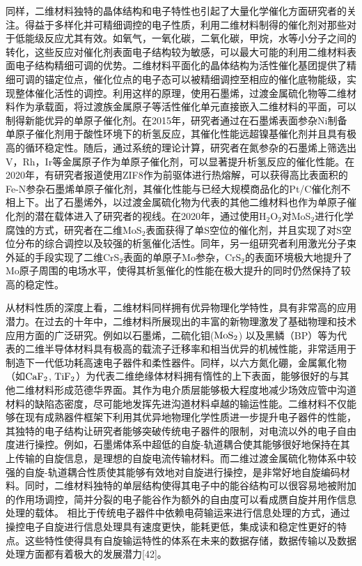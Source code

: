 同样，二维材料独特的晶体结构和电子特性也引起了大量化学催化方面研究者的关注。得益于多样化并可精细调控的电子性质，利用二维材料制得的催化剂对那些对于低能级反应尤其有效。如氧气，一氧化碳，二氧化碳，甲烷，水等小分子之间的转化，这些反应对催化剂表面电子结构较为敏感，可以最大可能的利用二维材料表面电子结构精细可调的优势。二维材料平面化的晶体结构为活性催化基团提供了精细可调的锚定位点，催化位点的电子态可以被精细调控至相应的催化底物能级，实现整体催化活性的调控。利用这样的原理，使用石墨烯，过渡金属硫化物等二维材料作为承载面，将过渡族金属原子等活性催化单元直接嵌入二维材料的平面，可以制得新能优异的单原子催化剂。在2015年，研究者通过在石墨烯表面参杂Ni制备单原子催化剂用于酸性环境下的析氢反应，其催化性能远超镍基催化剂并且具有极高的循环稳定性。随后，通过系统的理论计算，研究者在氮参杂的石墨烯上筛选出V，Rh，Ir等金属原子作为单原子催化剂，可以显著提升析氢反应的催化性能。在2020年，有研究者报道使用ZIF8作为前驱体进行热熔解，可以获得高比表面积的Fe-N参杂石墨烯单原子催化剂，其催化性能与已经大规模商品化的Pt/C催化剂不相上下。出了石墨烯外，以过渡金属硫化物为代表的其他二维材料也作为单原子催化剂的潜在载体进入了研究者的视线。在2020年，通过使用H$_2$O$_2$对MoS$_2$进行化学腐蚀的方式，研究者在二维MoS$_2$表面获得了单S空位的催化剂，并且实现了对S空位分布的综合调控以及较强的析氢催化活性。同年，另一组研究者利用激光分子束外延的手段实现了二维CrS$_2$表面的单原子Mo参杂，CrS$_2$的表面环境极大地提升了Mo原子周围的电场水平，使得其析氢催化的性能在极大提升的同时仍然保持了较高的稳定性。

从材料性质的深度上看，二维材料同样拥有优异物理化学特性，具有非常高的应用潜力。在过去的十年中，二维材料所展现出的丰富的新物理激发了基础物理和技术应用方面的广泛研究。例如以石墨烯，二硫化钼($\rm{MoS_{2}}$) 以及黑鳞（BP）等为代表的二维半导体材料具有极高的载流子迁移率和相当优异的机械性能，非常适用于制造下一代低功耗高速电子器件和柔性器件。同样，以六方氮化硼，金属氟化物（如$\rm{CaF_{2}}$, $\rm{TiF_{2}}$）为代表二维绝缘体材料拥有惰性的上下表面，能够很好的与其他二维材料形成范德华界面。其作为电介质层能够极大程度地减少场效应管中沟道材料的缺陷态密度，尽可能地发挥先进沟道材料卓越的输运性能。二维材料不仅能够在现有成熟器件框架下利用其优异地物理化学性质进一步提升电子器件的性能，其独特的电子结构让研究者能够突破传统电子器件的限制，对电流以外的电子自由度进行操控。例如，石墨烯体系中超低的自旋-轨道耦合使其能够很好地保持在其上传输的自旋信息，是理想的自旋电流传输材料。而二维过渡金属硫化物体系中较强的自旋-轨道耦合性质使其能够有效地对自旋进行操控，是非常好地自旋编码材料。同时，二维材料独特的单层结构使得其电子中的能谷结构可以很容易地被附加的作用场调控，简并分裂的电子能谷作为额外的自由度可以看成赝自旋并用作信息处理的载体。
相比于传统电子器件中依赖电荷输运来进行信息处理的方式，通过操控电子自旋进行信息处理具有速度更快，能耗更低，集成读和稳定性更好的特点。这些特性使得具有自旋输运特性的体系在未来的数据存储，数据传输以及数据处理方面都有着极大的发展潜力[42]。%

